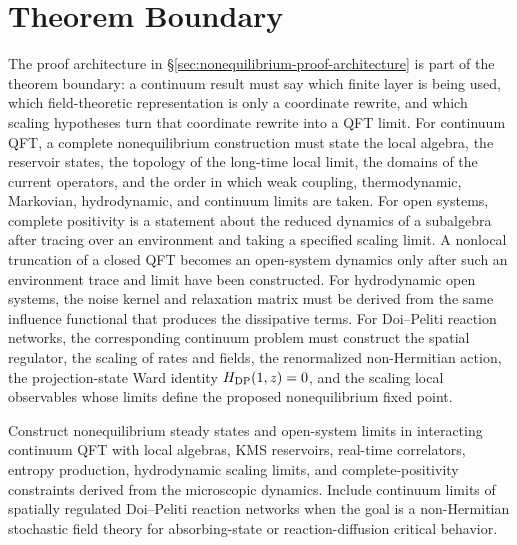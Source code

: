 \section{Theorem Boundary}

The proof architecture in
\S\ref{sec:nonequilibrium-proof-architecture} is part of the theorem
boundary: a continuum result must say which finite layer is being used, which
field-theoretic representation is only a coordinate rewrite, and which
scaling hypotheses turn that coordinate rewrite into a QFT limit.
For continuum QFT, a complete nonequilibrium construction must state the
local algebra, the reservoir states, the topology of the long-time local
limit, the domains of the current operators, and the order in which weak
coupling, thermodynamic, Markovian, hydrodynamic, and continuum limits are
taken.  For open systems, complete positivity is a statement about the
reduced dynamics of a subalgebra after tracing over an environment and taking
a specified scaling limit.  A nonlocal truncation of a closed QFT becomes an
open-system dynamics only after such an environment trace and limit have
been constructed.  For hydrodynamic open systems, the noise kernel and
relaxation matrix must be derived from the same influence functional that
produces the dissipative terms.
For Doi--Peliti reaction networks, the corresponding continuum problem must
construct the spatial regulator, the scaling of rates and fields, the
renormalized non-Hermitian action, the projection-state Ward identity
\(H_{\rm DP}(1,z)=0\), and the scaling local observables whose limits define
the proposed nonequilibrium fixed point.

\begin{openproblem}
\label{op:continuum-nonequilibrium-steady-states}
Construct nonequilibrium steady states and open-system limits in interacting
continuum QFT with local algebras, KMS reservoirs, real-time correlators,
entropy production, hydrodynamic scaling limits, and complete-positivity
constraints derived from the microscopic dynamics.  Include continuum limits
of spatially regulated Doi--Peliti reaction networks when the goal is a
non-Hermitian stochastic field theory for absorbing-state or reaction-diffusion
critical behavior.
\end{openproblem}
